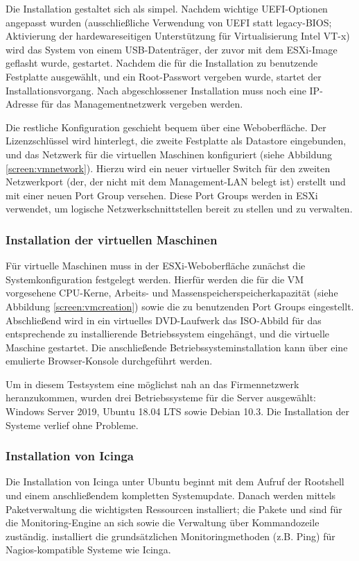 Die Installation gestaltet sich als simpel. Nachdem wichtige UEFI-Optionen angepasst wurden (ausschließliche Verwendung von UEFI statt legacy-BIOS; Aktivierung der hardewareseitigen Unterstützung für Virtualisierung \glqq{}Intel VT-x\grqq{}) wird das System von einem USB-Datenträger, der zuvor mit dem ESXi-Image geflasht wurde, gestartet. Nachdem die für die Installation zu benutzende Festplatte ausgewählt, und ein Root-Passwort vergeben wurde, startet der Installationsvorgang. Nach abgeschlossener Installation muss noch eine IP-Adresse für das Managementnetzwerk vergeben werden.

Die restliche Konfiguration geschieht bequem über eine Weboberfläche. Der Lizenzschlüssel wird hinterlegt, die zweite Festplatte als Datastore eingebunden, und das Netzwerk für die virtuellen Maschinen konfiguriert (siehe Abbildung \ref{screen:vmnetwork}). Hierzu wird ein neuer virtueller Switch für den zweiten Netzwerkport (der, der nicht mit dem Management-LAN belegt ist) erstellt und mit einer neuen Port Group versehen. Diese Port Groups werden in ESXi verwendet, um logische Netzwerkschnittstellen bereit zu stellen und zu verwalten. 

\subsubsection{Installation der virtuellen Maschinen}
\label{sec:InstallationVMs}
Für virtuelle Maschinen muss in der ESXi-Weboberfläche zunächst die Systemkonfiguration festgelegt werden. Hierfür werden die für die VM vorgesehene CPU-Kerne, Arbeits- und Massenspeicherspeicherkapazität (siehe Abbildung \ref{screen:vmcreation}) sowie die zu benutzenden Port Groups eingestellt. Abschließend wird in ein virtuelles DVD-Laufwerk das ISO-Abbild für das entsprechende zu installierende Betriebssystem eingehängt, und die virtuelle Maschine gestartet. Die anschließende Betriebssysteminstallation kann über eine emulierte Browser-Konsole durchgeführt werden.

Um in diesem Testsystem eine möglichst nah an das Firmennetzwerk heranzukommen, wurden drei Betriebssysteme für die Server ausgewählt: Windows Server 2019, Ubuntu 18.04 LTS sowie Debian 10.3. Die Installation der Systeme verlief ohne Probleme.

\subsubsection{Installation von \glqq{}Icinga\grqq{}}
\label{sec:InstallationIcinga}
Die Installation von \glqq{}Icinga\grqq{} unter Ubuntu beginnt mit dem Aufruf der Rootshell und einem anschließendem kompletten Systemupdate. Danach werden mittels Paketverwaltung die wichtigsten Ressourcen installiert; die Pakete  und  sind für die Monitoring-Engine an sich sowie die Verwaltung über Kommandozeile zuständig.  installiert die grundsätzlichen Monitoringmethoden (z.B. Ping) für Nagios-kompatible Systeme wie \glqq{}Icinga\grqq{}.

